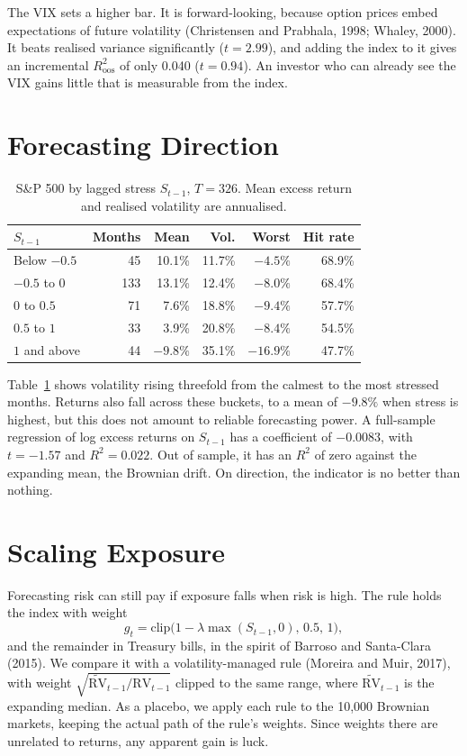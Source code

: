 \documentclass[10pt,twocolumn,letterpaper]{article}
\begin{document}
The VIX sets a higher bar. It is forward-looking, because option prices embed expectations of future volatility (Christensen and Prabhala, 1998; Whaley, 2000). It beats realised variance significantly ($t = 2.99$), and adding the index to it gives an incremental $R^2_{\text{oos}}$ of only 0.040 ($t = 0.94$). An investor who can already see the VIX gains little that is measurable from the index.

\section{Forecasting Direction}

\begin{table}[h]
\centering
\caption{S\&P 500 by lagged stress $S_{t-1}$, $T = 326$. Mean excess return and realised volatility are annualised.}
\label{tab:buckets}
\footnotesize
\setlength{\tabcolsep}{4pt}
\begin{tabular}{lrrrrr}
\toprule
$S_{t-1}$ & Months & Mean & Vol. & Worst & Hit rate \\
\midrule
Below $-0.5$ & 45 & 10.1\% & 11.7\% & $-4.5\%$ & 68.9\% \\
$-0.5$ to $0$ & 133 & 13.1\% & 12.4\% & $-8.0\%$ & 68.4\% \\
$0$ to $0.5$ & 71 & 7.6\% & 18.8\% & $-9.4\%$ & 57.7\% \\
$0.5$ to $1$ & 33 & 3.9\% & 20.8\% & $-8.4\%$ & 54.5\% \\
$1$ and above & 44 & $-9.8\%$ & 35.1\% & $-16.9\%$ & 47.7\% \\
\bottomrule
\end{tabular}
\end{table}

Table~\ref{tab:buckets} shows volatility rising threefold from the calmest to the most stressed months. Returns also fall across these buckets, to a mean of $-9.8\%$ when stress is highest, but this does not amount to reliable forecasting power. A full-sample regression of log excess returns on $S_{t-1}$ has a coefficient of $-0.0083$, with $t = -1.57$ and $R^2 = 0.022$. Out of sample, it has an $R^2$ of zero against the expanding mean, the Brownian drift. On direction, the indicator is no better than nothing.

\section{Scaling Exposure}

Forecasting risk can still pay if exposure falls when risk is high. The rule holds the index with weight
\begin{equation}
g_t = \mathrm{clip}\big(1 - \lambda\max(S_{t-1}, 0),\, 0.5,\, 1\big), \label{eq:g}
\end{equation}
and the remainder in Treasury bills, in the spirit of Barroso and Santa-Clara (2015). We compare it with a volatility-managed rule (Moreira and Muir, 2017), with weight $\sqrt{\tilde{\mathrm{RV}}_{t-1}/\mathrm{RV}_{t-1}}$ clipped to the same range, where $\tilde{\mathrm{RV}}_{t-1}$ is the expanding median. As a placebo, we apply each rule to the 10,000 Brownian markets, keeping the actual path of the rule's weights. Since weights there are unrelated to returns, any apparent gain is luck.
\end{document}
